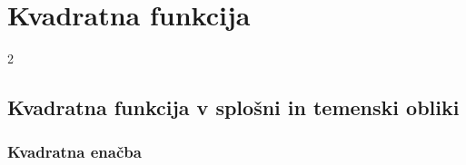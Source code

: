 \section{Kvadratna funkcija}

\begin{frame}
    \sectionpage
\end{frame}

\begin{frame}
    \begin{multicols}{2}
    \end{multicols}
\end{frame}



    \subsection{Kvadratna funkcija v splošni in temenski obliki}

        \begin{frame}
            \frametitle{Kvadratna enačba}
        \end{frame}


